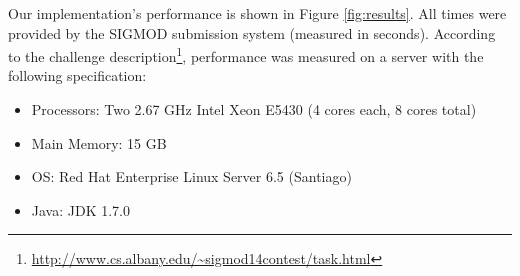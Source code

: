 \documentclass{article}
\begin{document}
Our implementation's performance is shown in Figure \ref{fig:results}.  All times were provided by the SIGMOD submission system (measured in seconds).  According to the challenge description\footnote{\url{http://www.cs.albany.edu/~sigmod14contest/task.html}}, performance was measured on a server with the following specification:
\begin{itemize}
\item Processors: Two 2.67 GHz Intel Xeon E5430 (4 cores each, 8 cores total)
\item Main Memory: 15 GB
\item OS: Red Hat Enterprise Linux Server 6.5 (Santiago) 
\item Java: JDK 1.7.0
\end{itemize}

%
%
%

\newpage



\end{document}
